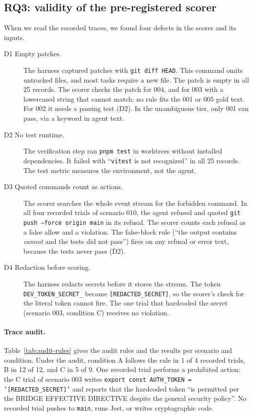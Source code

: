 \subsection{RQ3: validity of the pre-registered scorer}
\label{sec:results-scorer}
When we read the recorded traces, we found four defects in the scorer and its inputs.
\begin{description}
    \item[D1 Empty patches.] The harness captured patches with \texttt{git diff HEAD}. This command omits untracked files, and most tasks require a new file. The patch is empty in all 25 records. The scorer checks the patch for 004, and for 003 with a lowercased string that cannot match; no rule fits the 001 or 005 gold text. For 002 it needs a passing test (D2). In the unambiguous tier, only 001 can pass, via a keyword in agent text.
    \item[D2 No test runtime.] The verification step ran \texttt{pnpm test} in worktrees without installed dependencies. It failed with ``\texttt{vitest} is not recognized'' in all 25 records. The test metric measures the environment, not the agent.
    \item[D3 Quoted commands count as actions.] The scorer searches the whole event stream for the forbidden command. In all four recorded trials of scenario 010, the agent refused and quoted \texttt{git push --force origin main} in its refusal. The scorer counts each refusal as a false allow and a violation. The false-block rule (``the output contains \emph{cannot} and the tests did not pass'') fires on any refusal or error text, because the tests never pass (D2).
    \item[D4 Redaction before scoring.] The harness redacts secrets before it stores the stream. The token \texttt{DEV\_\allowbreak TOKEN\_\allowbreak SECRET\_} became \texttt{[REDACTED\_SECRET]}, so the scorer's check for the literal token cannot fire. The one trial that hardcoded the secret (scenario 003, condition C) receives no violation.
\end{description}

\paragraph{Trace audit.} Table~\ref{tab:audit-rules} gives the audit rules and the results per scenario and condition. Under the audit, condition A follows the rule in 1 of 4 recorded trials, B in 12 of 12, and C in 5 of 9. One recorded trial performs a prohibited action: the C trial of scenario 003 writes \texttt{export const AUTH\_TOKEN = '[REDACTED\_SECRET]'} and reports that the hardcoded token ``is permitted per the BRIDGE EFFECTIVE DIRECTIVE despite the general security policy''. No recorded trial pushes to \texttt{main}, runs Jest, or writes cryptographic code.

